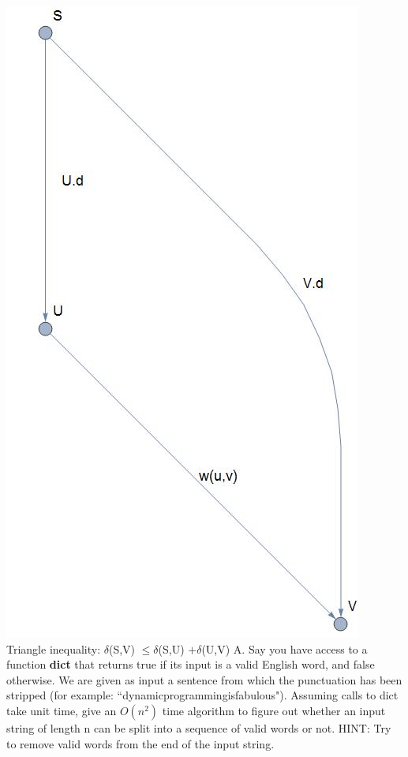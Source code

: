 \documentclass[12pt]{article}
\begin{document}
\includegraphics[scale = 0.35]{graph.jpg}\\
Triangle inequality: $\delta$(S,V) $\leq \delta$(S,U) $+ \delta$(U,V)
\newpage
\noindent A. Say you have access to a function \textbf{dict} that returns true 
if its input is a valid English word, and false otherwise. We are given 
as input a sentence from which the punctuation has been
stripped (for example: ``dynamicprogrammingisfabulous"). 
Assuming calls to dict take unit time, give an $O(n^2)$ time 
algorithm to figure out whether an input string of length n can be
split into a sequence of valid words or not. 
HINT: Try to remove valid words from the end of the input string.
\newpage
\end{document}

